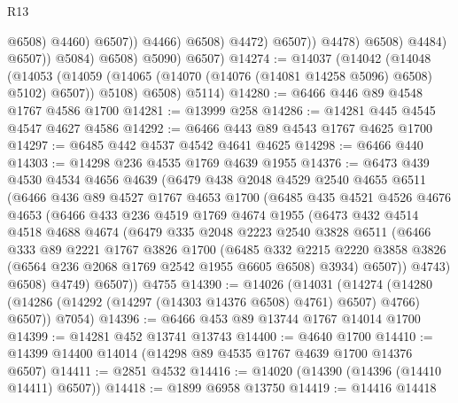 \begin{lexlean}{R13}
\begin{coremodule}
                                        @6508)
                                      @4460)
                                    @6507))
                                @4466)
                              @6508)
                            @4472)
                          @6507))
                      @4478)
                    @6508)
                  @4484)
                @6507))
            @5084)
          @6508)
        @5090)
      @6507)
@14274 := @14037
    (@14042
      (@14048
        (@14053 (@14059 (@14065 (@14070 (@14076 (@14081 @14258 @5096) @6508) @5102) @6507)) @5108)
        @6508)
      @5114)
@14280 := @6466 @446 @89 @4548 @1767 @4586 @1700
@14281 := @13999 @258
@14286 := @14281 @445 @4545 @4547 @4627 @4586
@14292 := @6466 @443 @89 @4543 @1767 @4625 @1700
@14297 := @6485 @442 @4537 @4542 @4641 @4625
@14298 := @6466 @440
@14303 := @14298 @236 @4535 @1769 @4639 @1955
@14376 := @6473
    @439
    @4530
    @4534
    @4656
    @4639
    (@6479
      @438
      @2048
      @4529
      @2540
      @4655
      @6511
      (@6466
        @436
        @89
        @4527
        @1767
        @4653
        @1700
        (@6485
          @435
          @4521
          @4526
          @4676
          @4653
          (@6466
            @433
            @236
            @4519
            @1769
            @4674
            @1955
            (@6473
              @432
              @4514
              @4518
              @4688
              @4674
              (@6479
                @335
                @2048
                @2223
                @2540
                @3828
                @6511
                (@6466
                  @333
                  @89
                  @2221
                  @1767
                  @3826
                  @1700
                  (@6485
                    @332
                    @2215
                    @2220
                    @3858
                    @3826
                    (@6564 @236 @2068 @1769 @2542 @1955 @6605 @6508)
                    @3934)
                  @6507))
              @4743)
            @6508)
          @4749)
        @6507))
    @4755
@14390 := @14026
    (@14031
      (@14274 (@14280 (@14286 (@14292 (@14297 (@14303 @14376 @6508) @4761) @6507) @4766) @6507))
      @7054)
@14396 := @6466 @453 @89 @13744 @1767 @14014 @1700
@14399 := @14281 @452 @13741 @13743
@14400 := @4640 @1700
@14410 := @14399 @14400 @14014 (@14298 @89 @4535 @1767 @4639 @1700 @14376 @6507)
@14411 := @2851 @4532
@14416 := @14020 (@14390 (@14396 (@14410 @14411) @6507))
@14418 := @1899 @6958 @13750
@14419 := @14416 @14418

\end{coremodule}
\end{lexlean}
